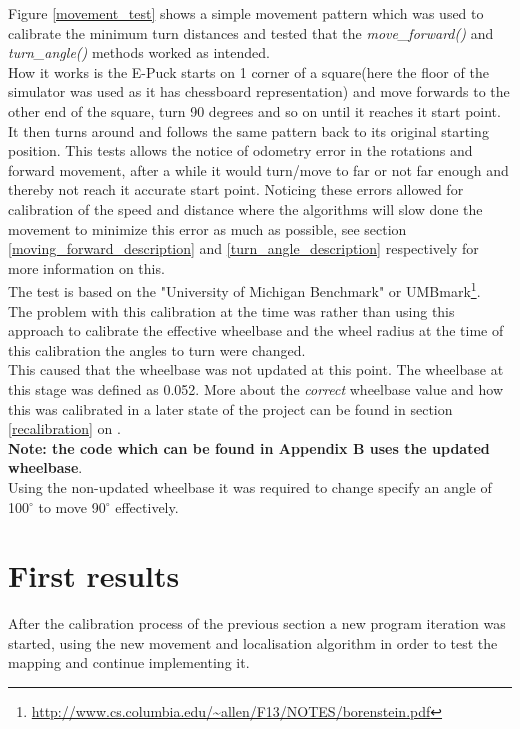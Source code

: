 Figure \ref{movement_test} shows a simple movement pattern which was used to calibrate the minimum turn distances and tested that the \textit{move\_forward()} and \textit{turn\_angle()} methods worked as intended. \\
How it works is the E-Puck starts on 1 corner of a square(here the floor of the simulator was used as it has chessboard representation) and move forwards to the other end of the square, turn 90 degrees and so on until it reaches it start point. It then turns around and follows the same pattern back to its original starting position. This tests allows the notice of odometry error in the rotations and forward movement, after a while it would turn/move to far or not far enough and thereby not reach it accurate start point. Noticing these errors allowed for calibration of the speed and distance where the algorithms will slow done the movement to minimize this error as much as possible, see section \ref{moving_forward_description} and \ref{turn_angle_description} respectively for more information on this.\\[3ex]
The test is based on the "University of Michigan Benchmark" or UMBmark\footnote{\url{http://www.cs.columbia.edu/~allen/F13/NOTES/borenstein.pdf}}.\\[3ex]

The problem with this calibration at the time was rather than using this approach to calibrate the effective wheelbase and the wheel radius at the time of this calibration the angles to turn were changed.\\
This caused that the wheelbase was not updated at this point. The wheelbase at this stage was defined as  0.052. More about the \textit{correct} wheelbase value and how this was calibrated in a later state of the project can be found in section \ref{recalibration} on \pageref{recalibration}.\\ \textbf{Note: the code which can be found in Appendix B uses the updated wheelbase}.\\
Using the non-updated wheelbase it was required to change specify an angle of 100$^{\circ}$ to move 90$^{\circ}$ effectively.

\section{First results}
After the calibration process of the previous section a new program iteration was started, using the new movement and localisation algorithm in order to test the mapping and continue implementing it. \\[3ex]

